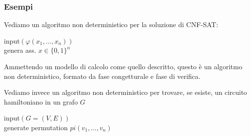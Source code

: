 \subsubsection{Esempi}

Vediamo un algoritmo non deterministico per la soluzione di CNF-SAT:
\begin{center}
	\begin{minipage}{.55\textwidth}
		\begin{tcolorbox}[
			colback=white,
			sharp corners,
			boxrule=.3mm,
			left=20pt,
			top=0pt,
			bottom=0pt,
			colbacktitle=white,
			coltitle=black
			]
			\begin{algorithm}[H]
				\SetAlgoNoEnd
				input$(\varphi (x_1, \dots, x_n))$\\
				genera ass. $x \in \{0,1\}^n$\\
			\end{algorithm}
		\end{tcolorbox}
	\end{minipage}
\end{center}

Ammettendo un modello di calcolo come quello descritto, questo è un algoritmo non deterministico, formato da fase congetturale e fase di verifica.

Vediamo invece un algoritmo non deterministico per trovare, se esiste, un circuito hamiltoniano in un grafo $G$

\begin{center}
\begin{minipage}{.7\textwidth}
\begin{tcolorbox}[
  colback=white,
  sharp corners,
  boxrule=.3mm,
  left=20pt,
  top=0pt,
  bottom=0pt,
  colbacktitle=white,
  coltitle=black
  ]
\begin{algorithm}[H]
\SetAlgoNoEnd
{}
input$(G = (V,E))$\\
generate permutation $pi(v_1, ..., v_n)$\\
\end{algorithm}
\end{tcolorbox}
\end{minipage}
\end{center}


